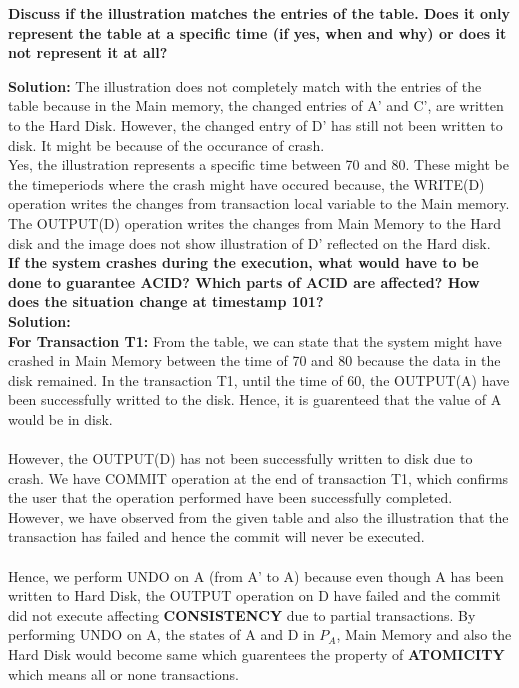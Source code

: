 \begin{enumerate}
\textbf{Discuss if the illustration matches the entries of the table. Does it only represent the table at a specific time (if yes, when and why) or does it not represent it at all?}

\textbf{Solution:} The illustration does not completely match with the entries of the table because in the Main memory, the changed entries of A' and C', are written to the Hard Disk.
However, the changed entry of D' has still not been written to disk. It might be because of the occurance of crash.\\ 
Yes, the illustration represents a specific time between 70 and 80. 
These might be the timeperiods where the crash might have occured because, the WRITE(D) operation writes the changes from transaction local variable to the Main memory.
The OUTPUT(D) operation writes the changes from Main Memory to the Hard disk and the image does not show illustration of D' reflected on the Hard disk.\\


\textbf{If the system crashes during the execution, what would have to be done to guarantee ACID?
Which parts of ACID are affected?
How does the situation change at timestamp 101?\\}
\textbf{Solution:}\\
\textbf{For Transaction T1:}
From the table, we can state that the system might have crashed in Main Memory between the time of 70 and 80 because the data in the disk remained. 
In the transaction T1, until the time of 60, the OUTPUT(A) have been successfully writted to the disk. Hence, it is guarenteed that the value of A would be in disk.\\\\
However, the OUTPUT(D) has not been successfully written to disk due to crash. 
We have COMMIT operation at the end of transaction T1, which confirms the user that the operation performed have been successfully completed. 
However, we have observed from the given table and also the illustration that the transaction has failed and hence the commit will never be executed.\\\\
Hence, we perform UNDO on A (from A' to A) because even though A has been written to Hard Disk, the OUTPUT operation on D have failed and the commit did not execute affecting \textbf{CONSISTENCY} due to partial transactions.
By performing UNDO on A, the states of A and D in {$P_A$}, Main Memory and also the Hard Disk would become same which guarentees the property of \textbf{ATOMICITY} which means all or none transactions. 


\end{enumerate}
